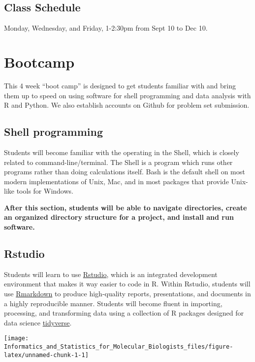 \documentclass[]{book}
\begin{document}
\section{Class Schedule}\label{class-schedule}

Monday, Wednesday, and Friday, 1-2:30pm from Sept 10 to Dec 10.

\chapter{Bootcamp}\label{bootcamp}

This 4 week ``boot camp'' is designed to get students familiar with and
bring them up to speed on using software for shell programming and data
analysis with R and Python. We also establish accounts on Github for
problem set submission.

\section{Shell programming}\label{shell-programming}

Students will become familiar with the operating in the Shell, which is
closely related to command-line/terminal. The Shell is a program which
runs other programs rather than doing calculations itself. Bash is the
default shell on most modern implementations of Unix, Mac, and in most
packages that provide Unix-like tools for Windows.

\textbf{After this section, students will be able to navigate
directories, create an organized directory structure for a project, and
install and run software.}

\section{Rstudio}\label{rstudio}

Students will learn to use \href{https://www.rstudio.com/}{Rstudio},
which is an integrated development environment that makes it way easier
to code in R. Within Rstudio, students will use
\href{https://rmarkdown.rstudio.com/}{Rmarkdown} to produce high-quality
reports, presentations, and documents in a highly reproducible manner.
Students will become fluent in importing, processing, and transforming
data using a collection of R packages designed for data science
\href{https://www.tidyverse.org/}{tidyverse}.

\begin{center}\texttt{[image: Informatics\_and\_Statistics\_for\_Molecular\_Biologists\_files/figure-latex/unnamed-chunk-1-1]} \end{center}
\end{document}
